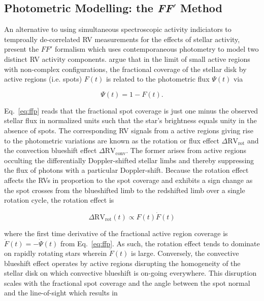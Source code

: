 \subsection{Photometric Modelling: the \textbf{\emph{FF}}$'$ Method} \label{sect:ffp}
An alternative to using simultaneous spectroscopic activity indiciators to temproally de-correlated
RV measurements for the effects of stellar activity, \citep{aigrain12} present the $FF'$ formalism
which uses contemporaneous photometry to model two distinct RV activity components. \cite{aigrain12}
argue that in the limit of small active regions with non-complex configurations, the fractional
coverage of the stellar disk by active regions (i.e. spots) $F(t)$ is related to the photometric flux
$\Psi(t)$ via

\begin{equation}
  \Psi(t) = 1 - F(t).
  \label{eq:ffp}
\end{equation}

\noindent Eq.~\ref{eq:ffp} reads that the fractional spot coverage is just one minus the observed
stellar flux in normalized units such that the star's brightness equals unity in the absence of spots.
The corresponding RV signals from a active regions giving rise to the photometric variations are known
as the rotation or flux effect $\Delta \text{RV}_{\text{rot}}$ and the convection blueshift effect
$\Delta \text{RV}_{\text{conv}}$. The former arises from active regions occulting the differentially
Doppler-shifted stellar limbs and thereby suppressing the flux of photons with a particular
Doppler-shift. Because the rotation effect affects the RVs in proportion to the spot coverage and
exhibits a sign change as the spot crosses from the blueshifted limb to the redshifted limb over a single
rotation cycle, the rotation effect is

\begin{equation}
  \Delta \text{RV}_{\text{rot}}(t) \propto F(t) \dot{F}(t)
\end{equation}

\indent where the first time derivative of the fractional active region coverage is
$\dot{F}(t) = -\dot{\Psi}(t)$ from Eq.~\ref{eq:ffp}. As such, the rotation effect tends to dominate
on rapidly rotating stars wherein $\dot{F}(t)$ is large. Conversely, the convective blueshift effect
operates by active regions disrupting the homogeneity of the stellar disk on which convective
blueshift is on-going everywhere. This disruption scales with the fractional spot coverage and
the angle between the spot normal and the line-of-sight which results in

